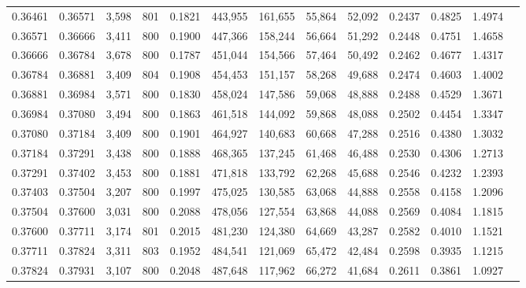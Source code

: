 \begin{tabular}{rrrrrrrrrrrrr}
0.36461 & 0.36571 &  3,598 & 801 &                                     0.1821 & 443,955 & 161,655 &  55,864 &  52,092 & 0.2437 & 0.4825 & 1.4974 \\
0.36571 & 0.36666 &  3,411 & 800 &                                     0.1900 & 447,366 & 158,244 &  56,664 &  51,292 & 0.2448 & 0.4751 & 1.4658 \\
0.36666 & 0.36784 &  3,678 & 800 &                                     0.1787 & 451,044 & 154,566 &  57,464 &  50,492 & 0.2462 & 0.4677 & 1.4317 \\
0.36784 & 0.36881 &  3,409 & 804 &                                     0.1908 & 454,453 & 151,157 &  58,268 &  49,688 & 0.2474 & 0.4603 & 1.4002 \\
0.36881 & 0.36984 &  3,571 & 800 &                                     0.1830 & 458,024 & 147,586 &  59,068 &  48,888 & 0.2488 & 0.4529 & 1.3671 \\
0.36984 & 0.37080 &  3,494 & 800 &                                     0.1863 & 461,518 & 144,092 &  59,868 &  48,088 & 0.2502 & 0.4454 & 1.3347 \\
0.37080 & 0.37184 &  3,409 & 800 &                                     0.1901 & 464,927 & 140,683 &  60,668 &  47,288 & 0.2516 & 0.4380 & 1.3032 \\
0.37184 & 0.37291 &  3,438 & 800 &                                     0.1888 & 468,365 & 137,245 &  61,468 &  46,488 & 0.2530 & 0.4306 & 1.2713 \\
0.37291 & 0.37402 &  3,453 & 800 &                                     0.1881 & 471,818 & 133,792 &  62,268 &  45,688 & 0.2546 & 0.4232 & 1.2393 \\
0.37403 & 0.37504 &  3,207 & 800 &                                     0.1997 & 475,025 & 130,585 &  63,068 &  44,888 & 0.2558 & 0.4158 & 1.2096 \\
0.37504 & 0.37600 &  3,031 & 800 &                                     0.2088 & 478,056 & 127,554 &  63,868 &  44,088 & 0.2569 & 0.4084 & 1.1815 \\
0.37600 & 0.37711 &  3,174 & 801 &                                     0.2015 & 481,230 & 124,380 &  64,669 &  43,287 & 0.2582 & 0.4010 & 1.1521 \\
0.37711 & 0.37824 &  3,311 & 803 &                                     0.1952 & 484,541 & 121,069 &  65,472 &  42,484 & 0.2598 & 0.3935 & 1.1215 \\
0.37824 & 0.37931 &  3,107 & 800 &                                     0.2048 & 487,648 & 117,962 &  66,272 &  41,684 & 0.2611 & 0.3861 & 1.0927 \\

\end{tabular}
